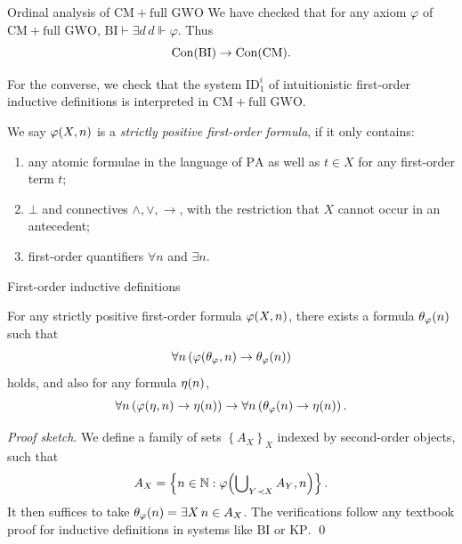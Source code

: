 \documentclass{beamer}
\begin{document}
\begin{frame}{Ordinal analysis of $\mathrm{CM} + \text{full $\mathrm{GWO}$}$}
  We have checked that for any axiom $\varphi$ of $\mathrm{CM} + \text{full $\mathrm{GWO}$}$, $\mathrm{BI} \vdash \exists d \, d \Vdash \varphi$. Thus
  \[\mathrm{Con}\mleft(\mathrm{BI}\mright) \rightarrow \mathrm{Con}\mleft(\mathrm{CM}\mright).\]

  \pause

  \vspace{1em}

  For the converse, we check that the system $\mathrm{ID}_1^i$ of intuitionistic first-order inductive definitions is interpreted in $\mathrm{CM} + \text{full $\mathrm{GWO}$}$.

  \vspace{0.6em}

  We say $\varphi\mleft(X, n\mright)$ is a \emph{strictly positive first-order formula}, if it only contains:
  \begin{enumerate}
    \item any atomic formulae in the language of $\mathrm{PA}$ as well as $t \in X$ for any first-order term $t$;
    \item $\bot$ and connectives $\land, \lor, \rightarrow$, with the restriction that $X$ cannot occur in an antecedent;
    \item first-order quantifiers $\forall n$ and $\exists n$.
  \end{enumerate}
\end{frame}

\begin{frame}{First-order inductive definitions}
  \begin{theorem}
    For any strictly positive first-order formula $\varphi\mleft(X, n\mright)$, there exists a formula $\theta_\varphi\mleft(n\mright)$ such that
    \[\forall n \left(\varphi\mleft(\theta_\varphi, n\mright) \rightarrow \theta_\varphi\mleft(n\mright)\right)\]
    holds, and also for any formula $\eta\mleft(n\mright)$,
    \[\forall n \left(\varphi\mleft(\eta, n\mright) \rightarrow \eta\mleft(n\mright)\right) \rightarrow \forall n \left(\theta_\varphi\mleft(n\mright) \rightarrow \eta\mleft(n\mright)\right).\]
  \end{theorem}

  \emph{Proof sketch}. We define a family of sets $\left\{A_X\right\}_X$ indexed by second-order objects, such that
  \[A_X = \left\{n \in \mathbb{N} : \varphi\mleft(\bigcup\nolimits_{Y \prec X} A_Y, n\mright)\right\}.\]
  It then suffices to take $\theta_\varphi\mleft(n\mright) = \exists X \, n \in A_X$. The verifications follow any textbook proof for inductive definitions in systems like $\mathrm{BI}$ or $\mathrm{KP}$. \qed
\end{frame}
\end{document}
